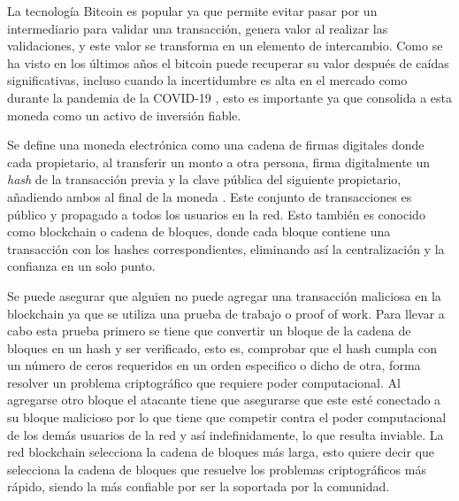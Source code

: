 La tecnología Bitcoin es popular ya que permite evitar pasar por un intermediario para validar una transacción, genera valor al realizar las validaciones, y este valor se transforma en un elemento de intercambio. Como se ha visto en los últimos años el bitcoin puede recuperar su valor después de caídas significativas, incluso cuando la incertidumbre es alta en el mercado como durante la pandemia de la COVID-19 \parencite{mudassirTimeseriesForecastingBitcoin2020}, esto es importante ya que consolida a esta moneda como un activo de inversión fiable.


Se define una moneda electrónica como una cadena de firmas digitales donde cada propietario, al transferir un monto a otra persona, firma digitalmente un \textit{hash} de la transacción previa y la clave pública del siguiente propietario, añadiendo ambos al final de la moneda \parencite{nakamotoBitcoinPeertoPeerElectronic2008}. Este conjunto de transacciones es público y propagado a todos los usuarios en la red. Esto también es conocido como blockchain o cadena de bloques, donde cada bloque contiene una transacción con los hashes correspondientes, eliminando así la centralización y la confianza en un solo punto.


Se puede asegurar que alguien no puede agregar una transacción maliciosa en la blockchain ya que se utiliza una prueba de trabajo o proof of work. Para llevar a cabo esta prueba primero se tiene que convertir un bloque de la cadena de bloques en un hash y ser verificado, esto es, comprobar que el hash cumpla con un número de ceros requeridos en un orden especifico o dicho de otra, forma resolver un problema criptográfico que requiere poder computacional. Al agregarse otro bloque el atacante tiene que asegurarse que este esté conectado a su bloque malicioso por lo que tiene que competir contra el poder computacional de los demás usuarios de la red y así indefinidamente, lo que resulta inviable. La red blockchain selecciona la cadena de bloques más larga, esto quiere decir que selecciona la cadena de bloques que resuelve los problemas criptográficos más rápido, siendo la más confiable por ser la soportada por la comunidad.


